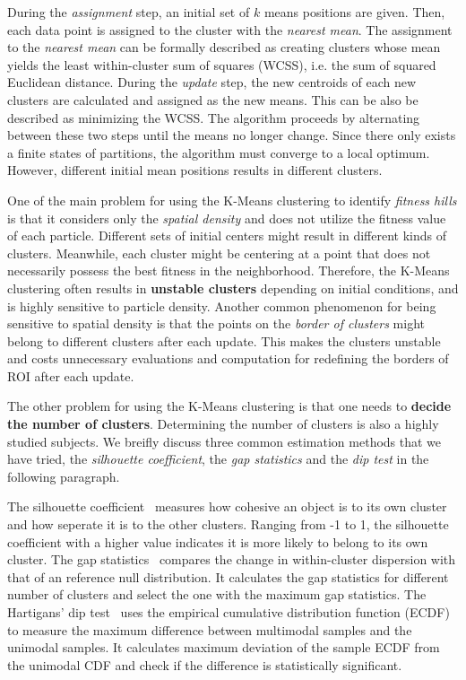 During the \textit{assignment} step, an initial set of $k$ means positions are given.
Then, each data point is assigned to the cluster with the \textit{nearest mean}.
The assignment to the \textit{nearest mean} can be formally described 
as creating clusters whose mean yields the least within-cluster sum of squares (WCSS), i.e. the sum of squared Euclidean distance.
During the \textit{update} step, the new centroids of each new clusters are calculated and assigned as the new means.
This can be also be described as minimizing the WCSS.
The algorithm proceeds by alternating between these two steps until the means no longer change.
Since there only exists a finite states of partitions, the algorithm must converge to a local optimum.
However, different initial mean positions results in different clusters.

One of the main problem for using the K-Means clustering to identify \textit{fitness hills} is that
it considers only the \textit{spatial density} and does not utilize the fitness value of each particle.
Different sets of initial centers might result in different kinds of clusters.
Meanwhile, each cluster might be centering at a point that does not necessarily possess the best fitness in the neighborhood.
Therefore, the K-Means clustering often results in \textbf{unstable clusters} depending on initial conditions, and is highly sensitive to particle density.
Another common phenomenon for being sensitive to spatial density is that 
the points on the \textit{border of clusters} might belong to different clusters after each update.
This makes the clusters unstable and costs unnecessary evaluations and computation for redefining the borders of ROI after each update. 

The other problem for using the K-Means clustering is that one needs to \textbf{decide the number of clusters}.
Determining the number of clusters is also a highly studied subjects.
We breifly discuss three common estimation methods that we have tried, 
the \textit{silhouette coefficient}, the \textit{gap statistics} and the \textit{dip test} in the following paragraph.

The silhouette coefficient~\cite{Rousseeuw:1987:silhouettes} measures how cohesive an object is to its own cluster and how seperate it is to the other clusters. Ranging from -1 to 1, the silhouette coefficient with a higher value indicates it is more likely to belong to its own cluster.
The gap statistics~\cite{Tibshirani:2001:gap} compares the change in within-cluster dispersion with that of an reference null distribution.
It calculates the gap statistics for different number of clusters and select the one with the maximum gap statistics.
The Hartigans' dip test~\cite{Hartigan:1985:dip} uses the empirical cumulative distribution function (ECDF) to measure the maximum difference between multimodal samples and the unimodal samples. It calculates maximum deviation of the sample ECDF from the unimodal CDF and check if the difference is statistically significant.


